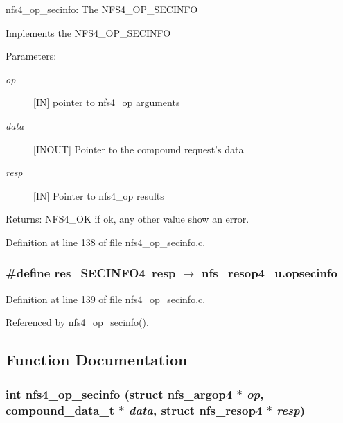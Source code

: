 nfs4\_\-op\_\-secinfo: The NFS4\_\-OP\_\-SECINFO

Implements the NFS4\_\-OP\_\-SECINFO

\begin{Desc}
\item[Parameters:]
\begin{description}
\item[{\em op}][IN] pointer to nfs4\_\-op arguments \item[{\em data}][INOUT] Pointer to the compound request's data \item[{\em resp}][IN] Pointer to nfs4\_\-op results\end{description}
\end{Desc}
\begin{Desc}
\item[Returns:]NFS4\_\-OK if ok, any other value show an error. \end{Desc}


Definition at line 138 of file nfs4\_\-op\_\-secinfo.c.
\subsubsection{\setlength{\rightskip}{0pt plus 5cm}\#define res\_\-SECINFO4\ resp $\rightarrow$ nfs\_\-resop4\_\-u.opsecinfo}\label{nfs4__op__secinfo_8c_a1}




Definition at line 139 of file nfs4\_\-op\_\-secinfo.c.

Referenced by nfs4\_\-op\_\-secinfo().

\subsection{Function Documentation}
\subsubsection{\setlength{\rightskip}{0pt plus 5cm}int nfs4\_\-op\_\-secinfo (struct nfs\_\-argop4 $\ast$ {\em op}, compound\_\-data\_\-t $\ast$ {\em data}, struct nfs\_\-resop4 $\ast$ {\em resp})}\label{nfs4__op__secinfo_8c_a2}




